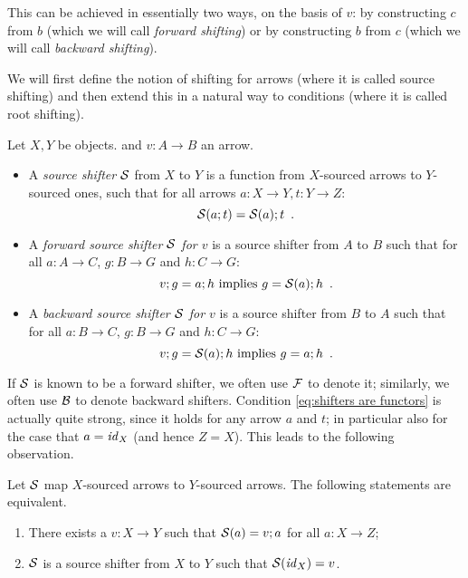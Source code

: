 This can be achieved in essentially two ways, on the basis of $v$: by constructing $c$ from $b$ (which we will call \emph{forward shifting}) or by constructing $b$ from $c$ (which we will call \emph{backward shifting}).

We will first define the notion of shifting for arrows (where it is called source shifting) and then extend this in a natural way to conditions (where it is called root shifting).

\begin{definition}
Let $X,Y$ be objects. and $v:A\to B$ an arrow.
\begin{itemize}[topsep=\smallskipamount]
\item A \emph{source shifter} $\mathcal{S}$ from $X$ to $Y$ is a function from $X$-sourced arrows to $Y$-sourced ones, such that for all arrows $a:X\to Y, t:Y\to Z$:
%
\begin{equation}\eqlabel{shifters are functors}
\cS(a;t) = \cS(a);t \enspace.
\end{equation}
%
\item A \emph{forward source shifter $\mathcal{S}$ for $v$} is a source shifter from $A$ to $B$ such that for all $a:A\to C$, $g:B\to G$ and $h:C\to G$:
%
\begin{equation}\eqlabel{forward condition}
v;g = a;h \text{ implies } g = \cS(a);h \enspace.
\end{equation}
%
\item A \emph{backward source shifter $\mathcal{S}$ for $v$} is a source shifter from $B$ to $A$ such that for all $a:B\to C$, $g:B\to G$ and $h:C\to G$:
%
\begin{equation}\eqlabel{backward condition}
v;g = \cS(a);h \text{ implies } g = a;h \enspace.
\end{equation}
\end{itemize}
\end{definition}
%
If $\mathcal{S}$ is known to be a forward shifter, we often use $\mathcal{F}$ to denote it; similarly, we often use $\mathcal{B}$ to denote backward shifters. Condition \eqref{eq:shifters are functors} is actually quite strong, since it holds for any arrow $a$ and $t$; in particular also for the case that $a=\mathit{id}_X$ (and hence $Z=X$). This leads to the following observation.
%
\begin{lemma}
Let $\mathcal{S}$ map $X$-sourced arrows to $Y$-sourced arrows. The following statements are equivalent.
\begin{enumerate}[topsep=\smallskipamount,label=(\alph*),ref=(\alph{enumi})]
\item\label{shifter-1} There exists a $v:X\to Y$ such that $\mathcal{S}(a)=v;a$ for all $a:X\to Z$;
\item\label{shifter-2} $\mathcal{S}$ is a source shifter from $X$ to $Y$ such that $\mathcal{S}(\mathit{id}_X)=v$.
\end{enumerate}
\end{lemma}

